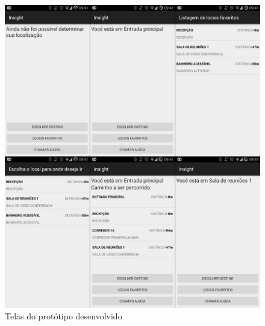 \documentclass[twoside,english,brazilian]{UNISINOSartigo}
\begin{document}
 	\begin{figure}[!ht]
 		\caption{Telas do protótipo desenvolvido}
 		\label{apendice:telas}
 		\centering%
 		\begin{minipage}{0.9\textwidth}
 			\includegraphics[width=\textwidth]{imgs/screenshots}
 		\end{minipage}
 	\end{figure}
\end{document}
